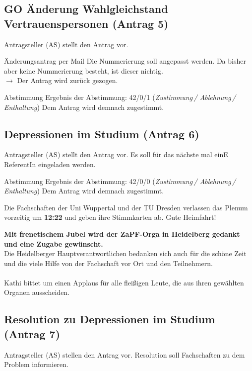   \subsection*{GO Änderung Wahlgleichstand Vertrauenspersonen (Antrag 5)}
    Antragsteller (AS) stellt den Antrag vor. \\
    \begin{danger}{Änderungsantrag per Mail}
      Die Nummerierung soll angepasst werden. Da bisher aber keine Nummerierung besteht, ist dieser nichtig. \\
      $\rightarrow$ Der Antrag wird zurück gezogen.
    \end{danger}

    \begin{success}{Abstimmung}
      Ergebnis der Abstimmung: 42/0/1 (\textit{Zustimmung\,/ Ablehnung\,/ Enthaltung})
      Dem Antrag wird demnach zugestimmt.
    \end{success}

  \subsection*{Depressionen im Studium (Antrag 6)}
    Antragsteller (AS) stellt den Antrag vor. Es soll für das nächste mal einE ReferentIn eingeladen werden.\\

    \begin{success}{Abstimmung}
      Ergebnis der Abstimmung: 42/0/0 (\textit{Zustimmung\,/ Ablehnung\,/ Enthaltung})
      Dem Antrag wird demnach zugestimmt.
    \end{success}

    \begin{info}{}
      Die Fachschaften der Uni Wuppertal und der TU Dresden verlassen das Plenum vorzeitig um \textbf{12:22} und geben ihre Stimmkarten ab. Gute Heimfahrt!
    \end{info}

    \textbf{Mit frenetischem Jubel wird der ZaPF-Orga in Heidelberg gedankt und eine Zugabe gewünscht.} \\
    Die Heidelberger Hauptverantwortlichen bedanken sich auch für die schöne Zeit und die viele Hilfe von der Fachschaft vor Ort und den Teilnehmern. \\ \\
    Kathi bittet um einen Applaus für alle fleißigen Leute, die aus ihren gewählten Organen ausscheiden.

  \subsection*{Resolution zu Depressionen im Studium (Antrag 7)}
    Antragsteller (AS) stellen den Antrag vor. Resolution soll Fachschaften zu dem Problem informieren.


